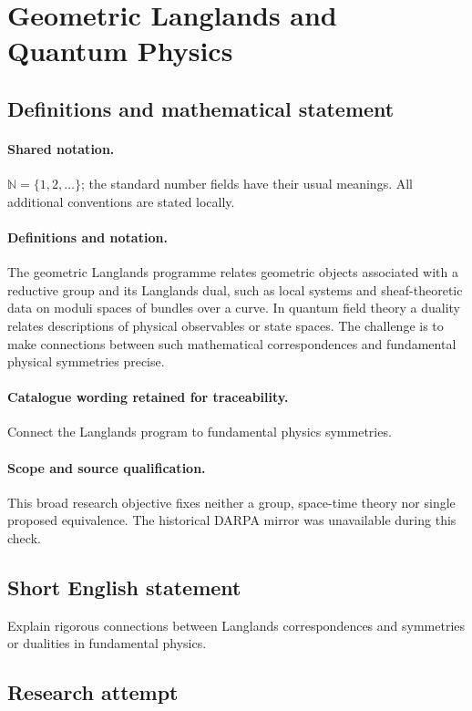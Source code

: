 \documentclass[11pt]{article}
\begin{document}
\section{Geometric Langlands and Quantum Physics}\label{statement}

\subsection{Definitions and mathematical statement}

\paragraph{Shared notation.}$\mathbb N=\{1,2,\ldots\}$; the standard number fields have their usual meanings. All additional conventions are stated locally.


\paragraph{Definitions and notation.}The geometric Langlands programme relates geometric objects associated with a reductive group and its Langlands dual, such as local systems and sheaf-theoretic data on moduli spaces of bundles over a curve. In quantum field theory a duality relates descriptions of physical observables or state spaces. The challenge is to make connections between such mathematical correspondences and fundamental physical symmetries precise.

\paragraph{Catalogue wording retained for traceability.}
Connect the Langlands program to fundamental physics symmetries.
\paragraph{Scope and source qualification.}This broad research objective fixes neither a group, space-time theory nor single proposed equivalence. The historical DARPA mirror was unavailable during this check.
\subsection{Short English statement}
Explain rigorous connections between Langlands correspondences and symmetries or dualities in fundamental physics.
\subsection{Research attempt}
\end{document}
